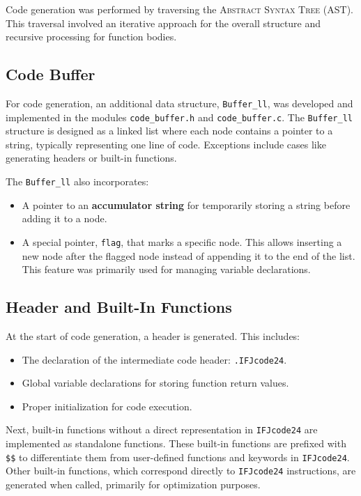 \documentclass[a4paper, 11pt]{article}
\begin{document}
Code generation was performed by traversing the \textsc{Abstract Syntax Tree} (AST). This traversal involved an iterative approach for the overall structure and recursive processing for function bodies.

\subsection{Code Buffer}

For code generation, an additional data structure, \verb|Buffer_ll|, was developed and implemented in the modules \verb|code_buffer.h| and \verb|code_buffer.c|. The \verb|Buffer_ll| structure is designed as a linked list where each node contains a pointer to a string, typically representing one line of code. Exceptions include cases like generating headers or built-in functions.

The \verb|Buffer_ll| also incorporates:
\begin{itemize}
    \item A pointer to an \textbf{accumulator string} for temporarily storing a string before adding it to a node.
    \item A special pointer, \verb|flag|, that marks a specific node. This allows inserting a new node after the flagged node instead of appending it to the end of the list. This feature was primarily used for managing variable declarations.
\end{itemize}


\subsection{Header and Built-In Functions}

At the start of code generation, a header is generated. This includes:
\begin{itemize}
    \item The declaration of the intermediate code header: \verb|.IFJcode24|.
    \item Global variable declarations for storing function return values.
    \item Proper initialization for code execution.
\end{itemize}

Next, built-in functions without a direct representation in \verb|IFJcode24| are implemented as standalone functions. These built-in functions are prefixed with \verb|$$| to differentiate them from user-defined functions and keywords in \verb |IFJcode24|. Other built-in functions, which correspond directly to \verb|IFJcode24| instructions, are generated when called, primarily for optimization purposes.
\end{document}

